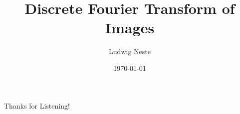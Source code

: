 \documentclass[aspectratio=169]{beamer}
\title{Discrete Fourier Transform of Images}
\date{\today}
\author{Ludwig Neste}
\institute{\colorbox{mDarkTeal}{\texttt{[image: su\_logo.pdf]}}}
\begin{document}
\begin{frame}
  \titlepage
\end{frame}





\begin{frame}{Thanks for Listening!}
  \nocite{*}
  \printbibliography
\end{frame}
\end{document}
